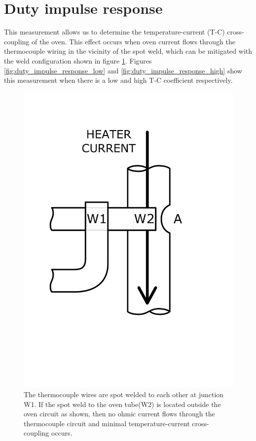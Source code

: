 \documentclass{article}
\begin{document}
\clearpage
\section{Duty impulse response}

This measurement allows us to determine the temperature-current (T-C) cross-coupling of the oven.
This effect occurs when oven current flows through the thermocouple wiring in the vicinity of the spot weld, which can be mitigated with the weld configuration shown in figure \ref{fig:weld_layout}.
Figures \ref{fig:duty_impulse_response_low} and \ref{fig:duty_impulse_response_high} show this measurement when there is a low and high T-C coefficient respectively.

\begin{figure}
    \center
    \includegraphics[scale=0.4]{figures/weld_layout.pdf}
    \caption{The thermocouple wires are spot welded to each other at junction W1.
    If the spot weld to the oven tube(W2) is located outside the oven circuit as shown, then no ohmic current flows through the thermocouple circuit and minimal temperature-current cross-coupling occurs.}
    \label{fig:weld_layout}
\end{figure}
\end{document}
